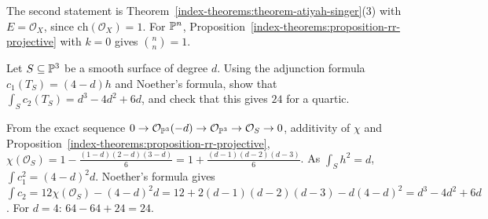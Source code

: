 \begin{solution}
The second statement is Theorem~\ref{index-theorems:theorem-atiyah-singer}(3) with $E = \mathcal{O}_X$, since $\mathrm{ch}(\mathcal{O}_X) = 1$. For $\mathbb{P}^n$, Proposition~\ref{index-theorems:proposition-rr-projective} with $k = 0$ gives
$\binom{n}{n} = 1$.
\end{solution}

\begin{exercise}\label{index-theorems:exercise-hypersurface-euler}
Let $S \subseteq \mathbb{P}^3$ be a smooth surface of degree $d$. Using the adjunction formula $c_1(T_S) = (4 - d)h$ and Noether's formula, show that $\int_Sc_2(T_S) = d^3 - 4d^2 + 6d$, and check that this gives $24$ for a quartic.
\end{exercise}

\begin{solution}
From the exact sequence $0 \to \mathcal{O}_{\mathbb{P}^3}(-d) \to \mathcal{O}_{\mathbb{P}^3} \to \mathcal{O}_S \to 0$, additivity of $\chi$ and Proposition~\ref{index-theorems:proposition-rr-projective},
$\chi(\mathcal{O}_S) = 1 - \frac{(1 - d)(2 - d)(3 - d)}{6} = 1 + \frac{(d - 1)(d - 2)(d - 3)}{6}$. As
$\int_Sh^2 = d$, $\int c_1^2 = (4 - d)^2d$. Noether's formula gives $\int c_2 = 12\chi(\mathcal{O}_S) - (4 - d)^2d = 12 + 2(d - 1)(d - 2)(d - 3) - d(4 - d)^2 = d^3 - 4d^2 + 6d$. For $d = 4$: $64 - 64 + 24 = 24$.
\end{solution}

